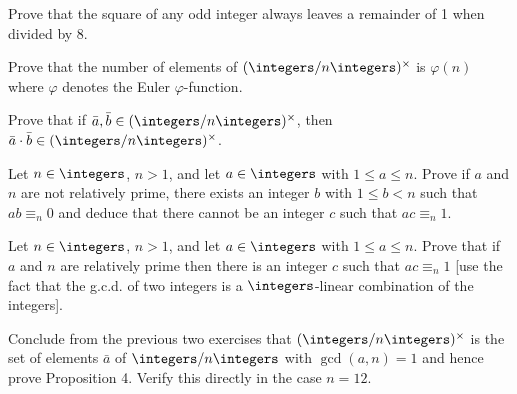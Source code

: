 
\begin{exercise}
	Prove that the square of any odd integer always leaves a remainder of 1 when divided by 8.
\end{exercise}


\begin{exercise}
	Prove that the number of elements of $(\integers/n\integers)^\times$ is $\varphi(n)$ where $\varphi$ denotes the Euler $\varphi$-function.
\end{exercise}


\begin{exercise}
	Prove that if $\bar{a}, \bar{b} \in (\integers/n\integers)^\times$, then $\bar{a} \cdot \bar{b} \in (\integers/n\integers)^\times$.
\end{exercise}


\begin{exercise}
	Let $n \in \integers$, $n > 1$, and let $a \in \integers$ with $1 \leq a \leq n$. Prove if $a$ and $n$ are not relatively prime, there exists an integer $b$ with $1 \leq b < n$ such that $ab \equiv_n 0$ and deduce that there cannot be an integer $c$ such that $ac \equiv_n 1$.
\end{exercise}


\begin{exercise}
	Let $n \in \integers$, $n > 1$, and let $a \in \integers$ with $1 \leq a \leq n$. Prove that if $a$ and $n$ are relatively prime then there is an integer $c$ such that $ac \equiv_n 1$ [use the fact that the g.c.d. of two integers is a $\integers$-linear combination of the integers].
\end{exercise}


\begin{exercise}
	Conclude from the previous two exercises that $(\integers/n\integers)^\times$ is the set of elements $\bar{a}$ of $\integers/n\integers$ with $\gcd(a,n) = 1$ and hence prove Proposition 4. Verify this directly in the case $n = 12$.
\end{exercise}

